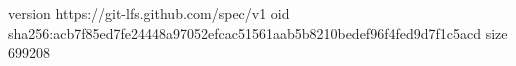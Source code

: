 version https://git-lfs.github.com/spec/v1
oid sha256:acb7f85ed7fe24448a97052efcac51561aab5b8210bedef96f4fed9d7f1c5acd
size 699208
